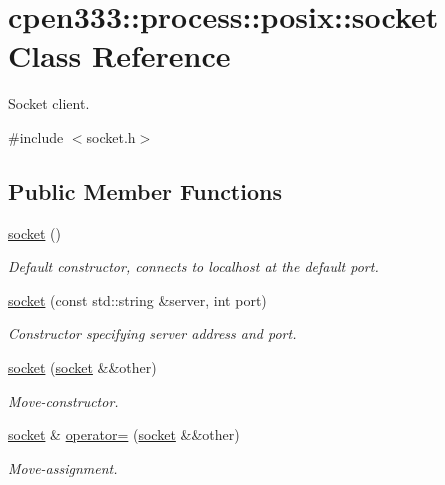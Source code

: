 \hypertarget{classcpen333_1_1process_1_1posix_1_1socket}{}\section{cpen333\+:\+:process\+:\+:posix\+:\+:socket Class Reference}
\label{classcpen333_1_1process_1_1posix_1_1socket}


Socket client.  




{\ttfamily \#include $<$socket.\+h$>$}

\subsection*{Public Member Functions}
\begin{DoxyCompactItemize}
\item 
\hyperlink{classcpen333_1_1process_1_1posix_1_1socket_a37b973439d588e1a3b3f43381e9fef55}{socket} ()
\begin{DoxyCompactList}\small\item\em Default constructor, connects to localhost at the default port. \end{DoxyCompactList}\item 
\hyperlink{classcpen333_1_1process_1_1posix_1_1socket_a0cb25f1ab47ee533f8c5a9b8968357bd}{socket} (const std\+::string \&server, int port)
\begin{DoxyCompactList}\small\item\em Constructor specifying server address and port. \end{DoxyCompactList}\item 
\hyperlink{classcpen333_1_1process_1_1posix_1_1socket_a8c0d036039c11145cc0b342b4006a0aa}{socket} (\hyperlink{classcpen333_1_1process_1_1posix_1_1socket}{socket} \&\&other)
\begin{DoxyCompactList}\small\item\em Move-\/constructor. \end{DoxyCompactList}\item 
\hyperlink{classcpen333_1_1process_1_1posix_1_1socket}{socket} \& \hyperlink{classcpen333_1_1process_1_1posix_1_1socket_a0ebb354104529fd60a05b9de29919ce8}{operator=} (\hyperlink{classcpen333_1_1process_1_1posix_1_1socket}{socket} \&\&other)
\begin{DoxyCompactList}\small\item\em Move-\/assignment. \end{DoxyCompactList}\item 

\end{DoxyCompactItemize}
